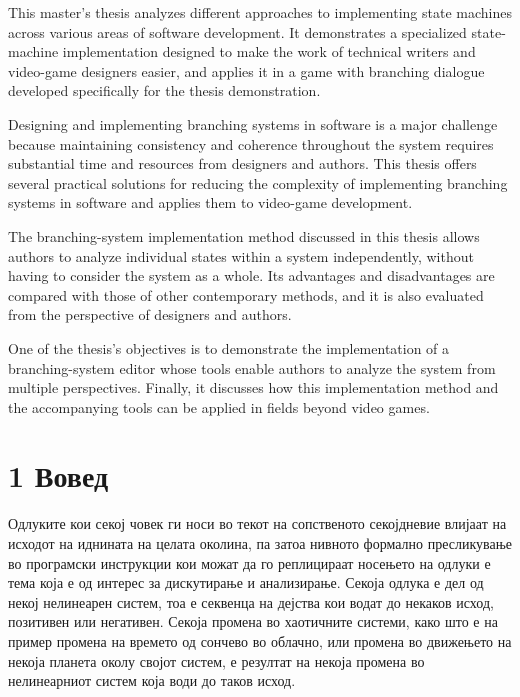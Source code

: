 \begin{abstractenglish}
This master's thesis analyzes different approaches to implementing state machines across various areas of software development. It demonstrates a specialized state-machine implementation designed to make the work of technical writers and video-game designers easier, and applies it in a game with branching dialogue developed specifically for the thesis demonstration.

Designing and implementing branching systems in software is a major challenge because maintaining consistency and coherence throughout the system requires substantial time and resources from designers and authors. This thesis offers several practical solutions for reducing the complexity of implementing branching systems in software and applies them to video-game development.

The branching-system implementation method discussed in this thesis allows authors to analyze individual states within a system independently, without having to consider the system as a whole. Its advantages and disadvantages are compared with those of other contemporary methods, and it is also evaluated from the perspective of designers and authors.

One of the thesis's objectives is to demonstrate the implementation of a branching-system editor whose tools enable authors to analyze the system from multiple perspectives. Finally, it discusses how this implementation method and the accompanying tools can be applied in fields beyond video games.
\end{abstractenglish}

\section{1 Вовед}

Одлуките кои секој човек ги носи во текот на сопственото секојдневие влијаат на исходот на иднината на целата околина, па затоа нивното формално пресликување во програмски инструкции кои можат да го реплицираат носењето на одлуки е тема која е од интерес за дискутирање и анализирање. Секоја одлука е дел од некој нелинеарен систем, тоа е секвенца на дејства кои водат до некаков исход, позитивен или негативен. Секоја промена во хаотичните системи, како што е на пример промена на времето од сончево во облачно, или промена во движењето на некоја планета околу својот систем, е резултат на некоја промена во нелинеарниот систем која води до таков исход.


